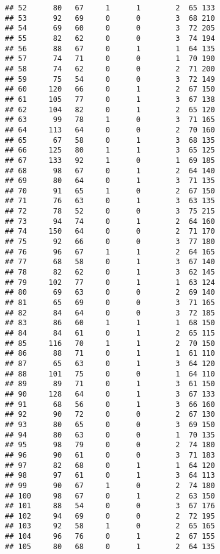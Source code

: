 \documentclass[
]{article}
\begin{document}
\begin{verbatim}
## 52      80   67     1      1        2  65 133
## 53      92   69     0      0        3  68 210
## 54      69   60     0      0        3  72 205
## 55      82   62     0      0        3  74 194
## 56      88   67     0      1        1  64 135
## 57      74   71     0      0        1  70 190
## 58      74   62     0      0        2  71 200
## 59      75   54     0      0        3  72 149
## 60     120   66     0      1        2  67 150
## 61     105   77     0      1        3  67 138
## 62     104   82     0      1        2  65 120
## 63      99   78     1      0        3  71 165
## 64     113   64     0      0        2  70 160
## 65      67   58     0      1        3  68 135
## 66     125   80     1      1        3  65 125
## 67     133   92     1      0        1  69 185
## 68      98   67     0      1        2  64 140
## 69      80   64     0      1        3  71 135
## 70      91   65     1      0        2  67 150
## 71      76   63     0      1        3  63 135
## 72      78   52     0      0        3  75 215
## 73      94   74     0      1        2  64 160
## 74     150   64     0      0        2  71 170
## 75      92   66     0      0        3  77 180
## 76      96   67     1      1        2  64 165
## 77      68   58     0      1        3  67 140
## 78      82   62     0      1        3  62 145
## 79     102   77     0      1        1  63 124
## 80      69   63     0      0        2  69 140
## 81      65   69     0      0        3  71 165
## 82      84   64     0      0        3  72 185
## 83      86   60     1      1        1  68 150
## 84      84   61     0      1        2  65 115
## 85     116   70     1      1        2  70 150
## 86      88   71     0      1        1  61 110
## 87      65   63     0      1        3  64 120
## 88     101   75     0      0        1  64 110
## 89      89   71     0      1        3  61 150
## 90     128   64     0      1        3  67 133
## 91      68   56     0      1        3  66 160
## 92      90   72     0      0        2  67 130
## 93      80   65     0      0        3  69 150
## 94      80   63     0      0        1  70 135
## 95      98   79     0      0        2  74 180
## 96      90   61     0      0        3  71 183
## 97      82   68     0      1        1  64 120
## 98      97   61     0      1        3  64 113
## 99      90   67     1      0        2  74 180
## 100     98   67     0      1        2  63 150
## 101     88   54     0      0        3  67 176
## 102     94   69     0      0        2  72 195
## 103     92   58     1      0        2  65 165
## 104     96   76     0      1        2  67 155
## 105     80   68     0      1        2  64 135

\end{verbatim}
\end{document}
